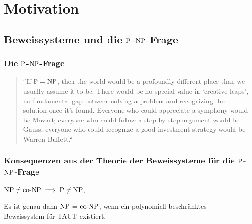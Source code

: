 \section{Motivation} 
\subsection{Beweissysteme und die $\P$-$\NP$-Frage}

\begin{frame}
  \frametitle{Die \(\P\)-\(\NP\)-Frage}
  
  \begin{quotation}
    ``If \(\P=\NP\), then the world would be a profoundly different place than we usually assume it to be. There would be no special value in `creative leaps', no fundamental gap between solving a problem and recognizing the solution once it's found. Everyone who could appreciate a symphony would be Mozart; everyone who could follow a step-by-step argument would be Gauss; everyone who could recognize a good investment strategy would be Warren Buffett.``
  \end{quotation}
  
   
\end{frame}

\begin{frame}
  \frametitle{Konsequenzen aus der Theorie der Beweissysteme für die \(\P\)-\(\NP\)-Frage}
  
  \begin{lemma}
    \(\NP \neq \coNP \implies \P \neq \NP\).
  \end{lemma}  
 
  \pause
  
  \begin{proposition} \label{prpNPcoNP}
    Es ist genau dann \(\NP\) = \(\coNP\), wenn ein polynomiell beschränktes Beweissystem für \(\TAUT\) existiert.
  \end{proposition}
  
\end{frame}
